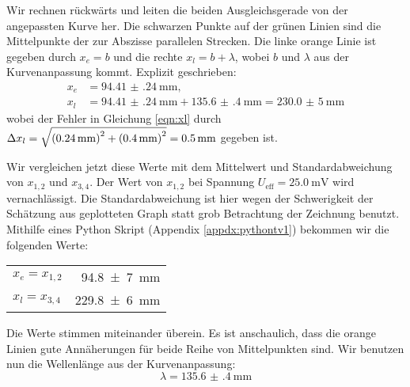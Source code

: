 		Wir rechnen rückwärts und leiten die beiden Ausgleichsgerade von der angepassten Kurve her. Die schwarzen Punkte auf der grünen Linien sind die Mittelpunkte der zur Abszisse parallelen Strecken. Die linke orange Linie ist gegeben durch $x_e = b$ und die rechte $x_l = b + \lambda$, wobei $b$ und $\lambda$ aus der Kurvenanpassung kommt. Explizit geschrieben:
		\begin{align}
			x_e & = \SI{94.41(24)}{\milli\meter},\\
			x_l & = \SI{94.41(24)}{\milli\meter} + \SI{135.6(4)}{\milli\meter} = \SI{230,0(5)}{\milli\meter} \label{eqn:xl}
		\end{align}
		wobei der Fehler in Gleichung \eqref{eqn:xl} durch $\Delta x_l = \sqrt{\left(\SI{0,24}{\milli\meter}\right)^2 + \left(\SI{0,4}{\milli\meter}\right)^2} = \SI{0,5}{\milli\meter}$ gegeben ist. 

		Wir vergleichen jetzt diese Werte mit dem Mittelwert und Standardabweichung von $x_{1,2}$ und $x_{3,4}$. Der Wert von $x_{1,2}$ bei Spannung $U_\text{eff} = \SI{25,0}{\milli\volt}$ wird vernachlässigt. Die Standardabweichung ist hier wegen der Schwerigkeit der Schätzung aus geplotteten Graph statt grob Betrachtung der Zeichnung benutzt. Mithilfe eines Python Skript (Appendix \ref{appdx:pythontv1}) bekommen wir die folgenden Werte:
		\begin{center}
			\begin{tabular}{lr}
				\toprule
				$x_e = x_{1,2}$ & \SI{94,8(7)}{\milli\meter} \\
				$x_l = x_{3,4}$ & \SI{229,8(6)}{\milli\meter} \\
				\bottomrule
			\end{tabular}
		\end{center}
		Die Werte stimmen miteinander überein. Es ist anschaulich, dass die orange Linien gute Annäherungen für beide Reihe von Mittelpunkten sind. Wir benutzen nun die Wellenlänge aus der Kurvenanpassung:
		\begin{equation}
			\lambda = \SI{135.6(4)}{\milli\meter}
		\end{equation}


